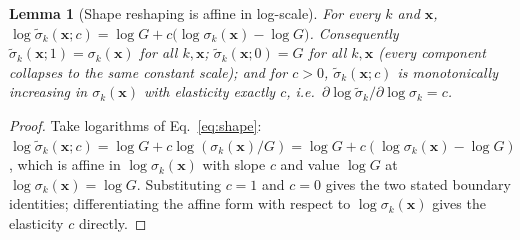 \documentclass[10pt,twocolumn,a4paper]{article}
\newtheorem{lemma}{Lemma}
\begin{document}
\begin{lemma}[Shape reshaping is affine in log-scale]
\label{lem:logaffine}
For every $k$ and $\bm x$, $\log\tilde\sigma_k(\bm x;c) = \log G + c\big(\log\sigma_k(\bm x) - \log G\big)$.
Consequently $\tilde\sigma_k(\bm x;1)=\sigma_k(\bm x)$ for all $k,\bm x$; $\tilde\sigma_k(\bm x;0)=G$
for all $k,\bm x$ (every component collapses to the same constant scale); and for $c>0$,
$\tilde\sigma_k(\bm x;c)$ is monotonically increasing in $\sigma_k(\bm x)$ with elasticity exactly
$c$, i.e.\ $\partial\log\tilde\sigma_k/\partial\log\sigma_k = c$.
\end{lemma}
\begin{proof}
Take logarithms of Eq.~\eqref{eq:shape}: $\log\tilde\sigma_k(\bm x;c) = \log G + c\log(\sigma_k(\bm x)/G)
= \log G + c(\log\sigma_k(\bm x)-\log G)$, which is affine in $\log\sigma_k(\bm x)$ with slope $c$ and
value $\log G$ at $\log\sigma_k(\bm x)=\log G$. Substituting $c=1$ and $c=0$ gives the two stated
boundary identities; differentiating the affine form with respect to $\log\sigma_k(\bm x)$ gives the
elasticity $c$ directly.
\end{proof}
\end{document}
